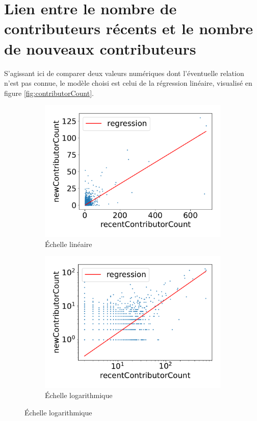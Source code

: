 \section{Lien entre le nombre de contributeurs récents et le nombre de nouveaux contributeurs}

S'agissant ici de comparer deux valeurs numériques dont l'éventuelle relation n'est pas connue, le modèle
choisi est celui de la régression linéaire, visualisé en figure \ref{fig:contributorCount}.

\begin{figure}
    \centering
    \begin{subfigure}[t]{0.5\textwidth}
        \includegraphics[width=\textwidth]{experiment/data_analysis/recentContributorCountRegression_linearScale}
        \caption{Échelle linéaire}
    \end{subfigure}%
    \begin{subfigure}[t]{0.5\textwidth}
        \includegraphics[width=\textwidth]{experiment/data_analysis/recentContributorCountRegression_logScale}
        \caption{Échelle logarithmique}
    \end{subfigure}


\end{figure}
